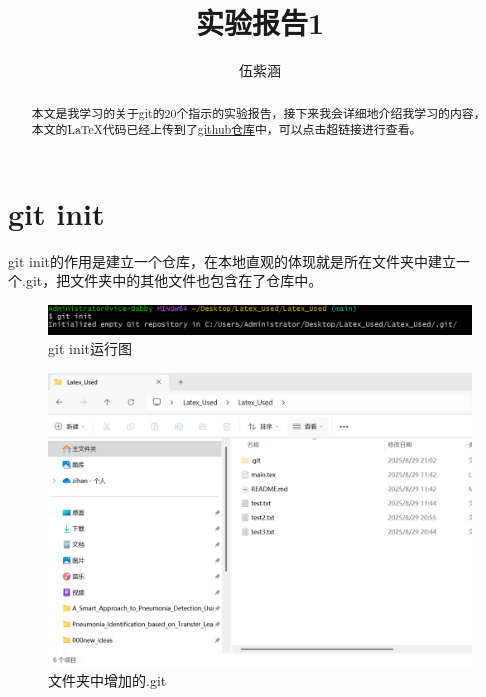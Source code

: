 \documentclass{article}
\title{实验报告1}
\author{伍紫涵}
\begin{document}
\maketitle

\begin{abstract}
本文是我学习的关于git的20个指示的实验报告，接下来我会详细地介绍我学习的内容，本文的LaTeX代码已经上传到了\href{https://github.com/qiqiqisi/Latex_Used.git}{github仓库}中，可以点击超链接进行查看。
\end{abstract}


{\hypersetup{hidelinks}\tableofcontents}


\section{git init}
git init的作用是建立一个仓库，在本地直观的体现就是所在文件夹中建立一个.git，把文件夹中的其他文件也包含在了仓库中。
\begin{figure}[H]
    \centering
    \includegraphics[width=1\linewidth]{git_init_code.png}
    \caption{git init运行图}
    \label{fig:init}
\end{figure}

\begin{figure}[H]
    \centering
    \includegraphics[width=1\linewidth]{git_init_show.png}
    \caption{文件夹中增加的.git}
    \label{fig:init1}
\end{figure}
\end{document}
